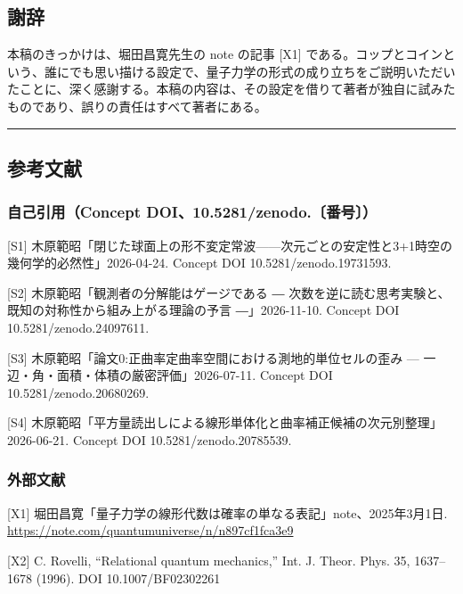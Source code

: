 \documentclass[
  a4paper,
]{ltjsarticle}
\begin{document}
\subsection{謝辞}\label{ux8b1dux8f9e}

本稿のきっかけは、堀田昌寛先生の note の記事 {[}X1{]}
である。コップとコインという、誰にでも思い描ける設定で、量子力学の形式の成り立ちをご説明いただいたことに、深く感謝する。本稿の内容は、その設定を借りて著者が独自に試みたものであり、誤りの責任はすべて著者にある。

\begin{center}\rule{0.5\linewidth}{0.5pt}\end{center}

\subsection{参考文献}\label{ux53c2ux8003ux6587ux732e}

\subsubsection{自己引用（Concept
DOI、10.5281/zenodo.〔番号〕）}\label{ux81eaux5df1ux5f15ux7528concept-doi10.5281zenodo.ux756aux53f7}

{[}S1{]}
木原範昭「閉じた球面上の形不変定常波------次元ごとの安定性と3+1時空の幾何学的必然性」2026-04-24.
Concept DOI 10.5281/zenodo.19731593.

{[}S2{]} 木原範昭「観測者の分解能はゲージである ―
次数を逆に読む思考実験と、既知の対称性から組み上がる理論の予言
―」2026-11-10. Concept DOI 10.5281/zenodo.24097611.

{[}S3{]} 木原範昭「論文0:正曲率定曲率空間における測地的単位セルの歪み
--- 一辺・角・面積・体積の厳密評価」2026-07-11. Concept DOI
10.5281/zenodo.20680269.

{[}S4{]}
木原範昭「平方量読出しによる線形単体化と曲率補正候補の次元別整理」2026-06-21.
Concept DOI 10.5281/zenodo.20785539.

\subsubsection{外部文献}\label{ux5916ux90e8ux6587ux732e}

{[}X1{]}
堀田昌寛「量子力学の線形代数は確率の単なる表記」note、2025年3月1日.
\url{https://note.com/quantumuniverse/n/n897cf1fca3e9}

{[}X2{]} C. Rovelli, ``Relational quantum mechanics,'' Int. J. Theor.
Phys. 35, 1637--1678 (1996). DOI 10.1007/BF02302261
\end{document}
